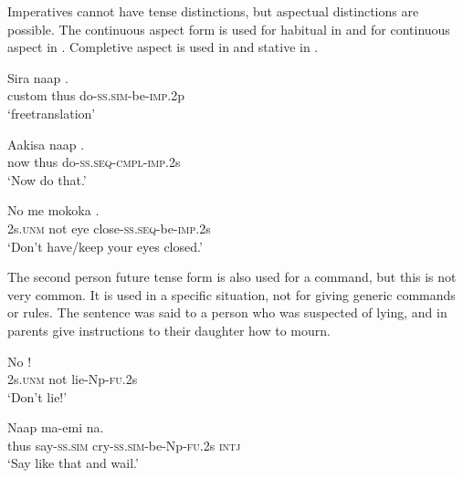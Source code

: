 Imperatives cannot have tense distinctions, but aspectual distinctions are possible. The continuous aspect form is used for habitual in  and for continuous aspect in . Completive aspect is used in  and stative in .

\ea%
\label{ex:x1896}
\gll Sira naap . \\
custom thus do-\textsc{ss}.\textsc{sim}-be-\textsc{imp}.2p      \\
\glt `freetranslation'
\z





\ea%
\label{ex:x1161}
\gll Aakisa  naap  . \\
now  thus  do-\textsc{ss}.\textsc{seq}-\textsc{cmpl}-\textsc{imp}.2s      \\
\glt `Now do that.'
\z





\ea%
\label{ex:x1162}
\gll No  me  mokoka  . \\
2s.\textsc{unm}  not  eye  close-\textsc{ss}.\textsc{seq}-be-\textsc{imp}.2s      \\
\glt `Don't have/keep your eyes closed.'
\z





The second person future tense form is also used for a command, but this is not very common. It is used in a specific situation, not for giving generic commands or rules. The sentence  was said to a person who was suspected of lying, and in  parents give instructions to their daughter how to mourn.

\ea%
\label{ex:x1080}
\gll No    ! \\
 2s.\textsc{unm}  not  lie-Np-\textsc{fu}.2s     \\
\glt `Don't lie!'
\z





\ea%
\label{ex:x1081}
\gll Naap  ma-emi    na. \\
thus  say-\textsc{ss}.\textsc{sim}  cry-\textsc{ss}.\textsc{sim}-be-Np-\textsc{fu}.2s  \textsc{intj}      \\
\glt `Say like that and wail.'
\z







